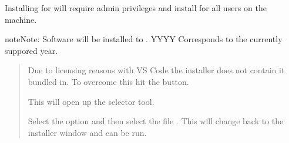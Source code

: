 \documentclass[letterpaper,10pt,english]{sphinxmanual}
\begin{document}
\noindent{}

Installing for  will require admin privileges and install for all users on the machine.

\begin{sphinxadmonition}{note}{Note:}
Software will be installed to . YYYY Corresponds to the currently suppored year.
\end{sphinxadmonition}

\begin{quote}

Due to licensing reasons with VS Code the installer does not contain it bundled in. To overcome this hit the  button.

\noindent{}

This will open up the selector tool.

\noindent{}

Select the  option and then select the file . This will change back to the installer window and  can be run.

\noindent{}
\end{quote}
\end{document}
